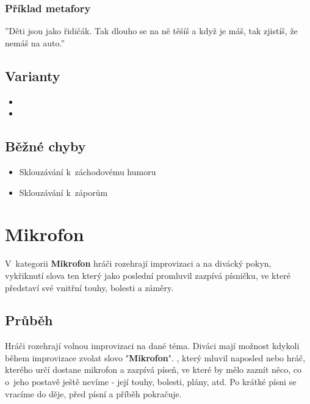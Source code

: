 \subsubsection{Příklad metafory}  
''Děti jsou jako řidičák. Tak dlouho se na ně těšíš a když je máš, tak zjistíš, že nemáš na auto.'' 
 
\subsection{ Varianty } \begin{itemize}
\item  {}
\item  {}
\end{itemize}
 
\subsection{ Běžné chyby } \begin{itemize}
\item  Sklouzávání k~záchodovému humoru
\item  Sklouzávání k~záporům  
\end{itemize}
 
 
 
 
 
\needspace{5cm} \section{Mikrofon} \label{mikrofon}  
 
 
V~kategorii \textbf{Mikrofon} hráči rozehrají improvizaci a na divácký pokyn, vykřiknutí slova   ten který jako poslední promluvil zazpívá písničku, ve které představí své vnitřní touhy, bolesti a záměry. 
 
 
\subsection{Průběh} Hráči rozehrají volnou improvizaci na dané téma. Diváci mají možnost kdykoli během improvizace zvolat slovo "\textbf{Mikrofon}". , který mluvil naposled nebo hráč, kterého určí  dostane mikrofon a zazpívá píseň, ve které by mělo zaznít něco, co o~jeho postavě ještě nevíme - její touhy, bolesti, plány, atd. Po krátké písni se vracíme do děje, před písní a příběh pokračuje.  
 
